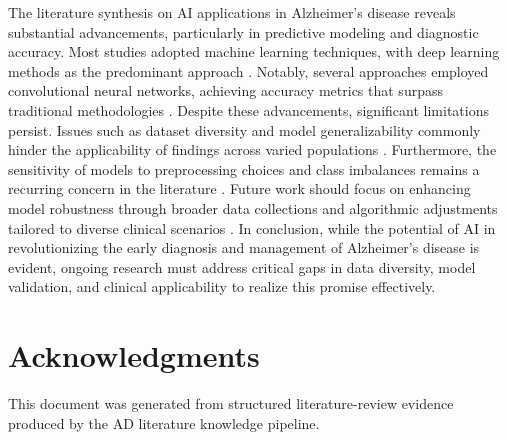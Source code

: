 \documentclass{MITcsail}
\begin{document}
The literature synthesis on AI applications in Alzheimer's disease reveals substantial advancements, particularly in predictive modeling and diagnostic accuracy. Most studies adopted machine learning techniques, with deep learning methods as the predominant approach \citep{ref_10_3389_fpubh_2022_853294,ref_10_1016_j_neuroimage_2020_117203,ref_10_3389_fpubh_2022_834032}. Notably, several approaches employed convolutional neural networks, achieving accuracy metrics that surpass traditional methodologies \citep{ref_10_1016_j_mri_2021_02_001,ref_10_3390_brainsci10020084}. Despite these advancements, significant limitations persist. Issues such as dataset diversity and model generalizability commonly hinder the applicability of findings across varied populations \citep{ref_10_1002_alz_13390,ref_10_1016_j_ejrad_2023_110934}. Furthermore, the sensitivity of models to preprocessing choices and class imbalances remains a recurring concern in the literature \citep{ref_10_1109_access_2021_3090474,ref_10_1016_s2589_7500_22_00169_8}. Future work should focus on enhancing model robustness through broader data collections and algorithmic adjustments tailored to diverse clinical scenarios \citep{ref_10_1016_j_neuroimage_2020_117203,ref_10_1016_j_arr_2024_102497}. In conclusion, while the potential of AI in revolutionizing the early diagnosis and management of Alzheimer's disease is evident, ongoing research must address critical gaps in data diversity, model validation, and clinical applicability to realize this promise effectively.

\clearpage

\nocite{ref_10_3389_fpubh_2022_834032,ref_10_1016_j_jbi_2020_103411,ref_10_1038_s41598_020_79243_9,ref_10_1016_s2589_7500_22_00169_8,ref_10_1002_alz_12032,ref_10_1016_j_neurobiolaging_2021_04_024,ref_10_1093_jamia_ocac168,ref_10_1016_j_nicl_2021_102712,ref_10_1016_j_irbm_2020_06_006,ref_10_1016_j_arr_2024_102497,ref_10_1016_j_compbiomed_2021_104678,ref_10_3389_fpubh_2022_853294,ref_10_1111_nan_12759,ref_10_1016_j_neucom_2020_01_053,ref_10_1016_j_cmpb_2021_106032,ref_10_3389_fpubh_2022_772592,ref_10_1016_j_compbiomed_2021_105032,ref_10_1016_j_compbiomed_2021_105056,ref_10_3390_brainsci10020084,ref_10_1016_j_bspc_2021_103293,ref_10_1109_access_2021_3090474,ref_10_1016_j_neuroimage_2020_117203,ref_10_1016_j_measen_2022_100506,ref_10_1109_jbhi_2021_3053568,ref_10_1016_j_matpr_2021_03_061,ref_10_1038_s41598_020_80312_2,ref_10_1007_s44174_023_00078_9,ref_10_1002_alz_13390,ref_10_1016_j_ejrad_2023_110934,ref_10_1016_j_mri_2021_02_001}


\section*{Acknowledgments}
This document was generated from structured literature-review evidence produced by the AD literature knowledge pipeline.
\end{document}
